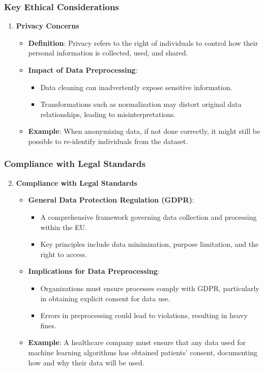 \documentclass{beamer}
\begin{document}
\begin{frame}[fragile]
    \frametitle{Key Ethical Considerations}
    \begin{enumerate}
        \item \textbf{Privacy Concerns}
        \begin{itemize}
            \item \textbf{Definition}: Privacy refers to the right of individuals to control how their personal information is collected, used, and shared.
            \item \textbf{Impact of Data Preprocessing}:
            \begin{itemize}
                \item Data cleaning can inadvertently expose sensitive information.
                \item Transformations such as normalization may distort original data relationships, leading to misinterpretations.
            \end{itemize}
            \item \textbf{Example}: When anonymizing data, if not done correctly, it might still be possible to re-identify individuals from the dataset.
        \end{itemize}
    \end{enumerate}
\end{frame}

\begin{frame}[fragile]
    \frametitle{Compliance with Legal Standards}
    \begin{enumerate}
        \setcounter{enumi}{1}
        \item \textbf{Compliance with Legal Standards}
        \begin{itemize}
            \item \textbf{General Data Protection Regulation (GDPR)}:
            \begin{itemize}
                \item A comprehensive framework governing data collection and processing within the EU.
                \item Key principles include data minimization, purpose limitation, and the right to access.
            \end{itemize}
            \item \textbf{Implications for Data Preprocessing}:
            \begin{itemize}
                \item Organizations must ensure processes comply with GDPR, particularly in obtaining explicit consent for data use.
                \item Errors in preprocessing could lead to violations, resulting in heavy fines.
            \end{itemize}
            \item \textbf{Example}: A healthcare company must ensure that any data used for machine learning algorithms has obtained patients' consent, documenting how and why their data will be used.
        \end{itemize}
    \end{enumerate}
\end{frame}
\end{document}
